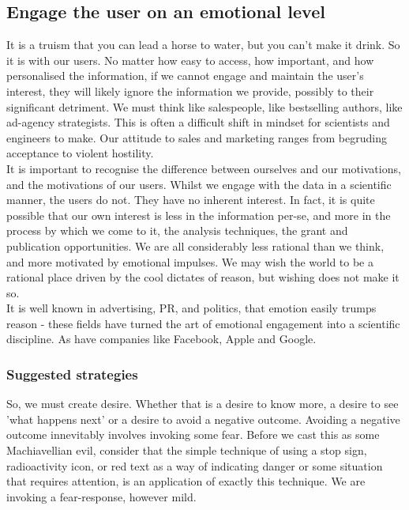 \subsection{Engage the user on an emotional level}
It is a truism that you can lead a horse to water, but you can't make it drink. So it is with our users.
No matter how easy to access, how important, and how personalised the information, if we cannot engage and maintain the user's interest,
they will likely ignore the information we provide, possibly to their significant detriment.
We must think like salespeople, like bestselling authors, like ad-agency strategists.
This is often a difficult shift in mindset for scientists and engineers to make.
Our attitude to sales and marketing ranges from begruding acceptance to violent hostility. \\

It is important to recognise the difference between ourselves and our motivations, and the motivations of our users. Whilst we engage with the data in a scientific
manner, the users do not. They have no inherent interest. In fact, it is quite possible that our own interest is less in the information per-se, and more in the process
by which we come to it, the analysis techniques, the grant and publication opportunities. We are all considerably less rational than we think, and more motivated by
emotional impulses. We may wish the world to be a rational place driven by the cool dictates of reason, but wishing does not make it so. \\

It is well known in advertising, PR, and politics, that emotion easily trumps reason - these fields have turned the art of emotional engagement into a scientific discipline.
As have companies like Facebook, Apple and Google.

\subsubsection*{Suggested strategies}

So, we must create desire. Whether that is a desire to know more, a desire to see 'what happens next' or a desire to avoid a negative outcome.
Avoiding a negative outcome innevitably involves invoking some fear. Before we cast this as some Machiavellian evil, consider that the simple
technique of using a stop sign, radioactivity icon, or red text as a way of indicating danger or some situation that requires attention, is an
application of exactly this technique. We are invoking a fear-response, however mild. \\

